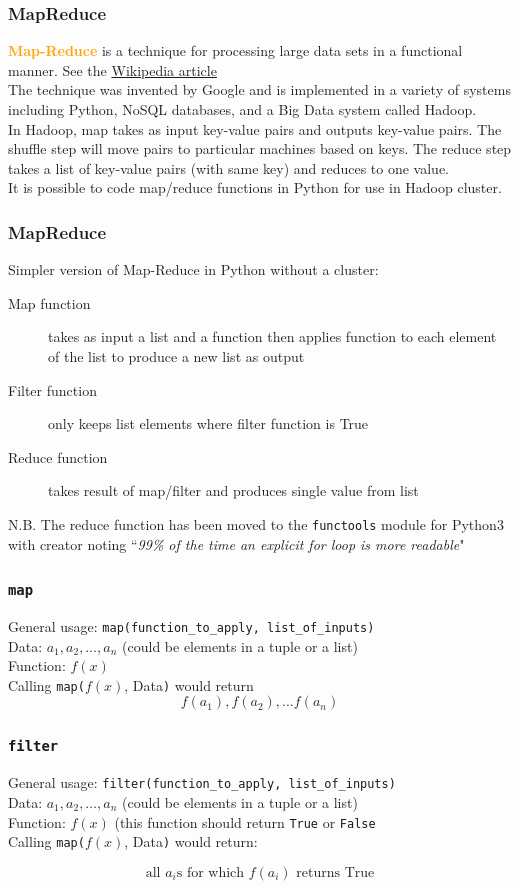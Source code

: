 \documentclass[xcolor=svgnames, handout]{beamer}
\newcommand{\nl}{\\[1em]}
\newcommand{\define}[1]{\textbf{\textcolor{orange}{#1}}}
\newcommand{\ft}[1]{\frametitle{#1}}
\begin{document}
\begin{frame}[fragile]\ft{MapReduce}
\define{Map-Reduce} is a technique for processing large data sets in a functional manner. See the \href{https://en.wikipedia.org/wiki/MapReduce}{Wikipedia article}\nl
The technique was invented by Google and is implemented in a variety of systems including Python, NoSQL databases, and a Big Data system called Hadoop.\nl
In Hadoop, map takes as input key-value pairs and outputs key-value pairs.  The shuffle step will move pairs to particular machines based on keys.  The reduce step takes a list of key-value pairs (with same key) and reduces to one value.\nl
It is possible to code map/reduce functions in Python for use in Hadoop cluster.\nl
\end{frame}

\begin{frame}[fragile]\ft{MapReduce}
Simpler version of Map-Reduce in Python without a cluster:\nl
\begin{description}
\item[Map function] takes as input a list and a function then applies function to each element of the list to produce a new list as output
\item[Filter function]  only keeps list elements where filter function is True
\item[Reduce function] takes result of map/filter and produces single value from list
\end{description}
N.B. The  reduce function has been moved to the {\tt functools} module for Python3 with creator noting ``\textit{99\% of the time an explicit for loop is more readable}"
\end{frame}


\begin{frame}[fragile]\ft{\tt map}
General usage: \verb|map(function_to_apply, list_of_inputs)|\\[1em]

Data: $a_1, a_2, \dots, a_n$ (could be elements in a tuple or a list)\\
Function: $f(x)$\\[1em]

Calling {\tt map(}$f(x)$, Data{\tt )} would return 
$$f(a_1), f(a_2), \dots f(a_n)$$
\end{frame}


\begin{frame}[fragile]\ft{\tt filter}
General usage: \verb|filter(function_to_apply, list_of_inputs)|\\[1em]

Data: $a_1, a_2, \dots, a_n$ (could be elements in a tuple or a list)\\
Function: $f(x)$ (this function should return {\tt True} or {\tt False} \\[1em]

Calling {\tt map(}$f(x)$, Data{\tt )} would return:

$$\text{all } a_i \text{s for which }f(a_i) \text{ returns True} $$


\end{frame}
\end{document}
